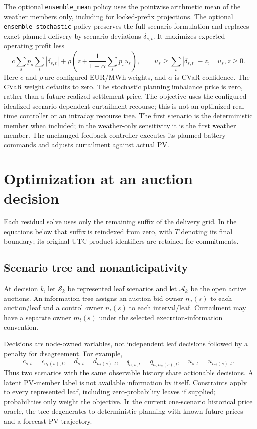 \documentclass[11pt,a4paper]{article}
\begin{document}
The optional \texttt{ensemble\_mean} policy uses the pointwise arithmetic mean
of the weather members only, including for locked-prefix projections. The
optional \texttt{ensemble\_stochastic} policy preserves the full scenario
formulation and replaces exact planned delivery by scenario deviations $\delta_{s,t}$.
It maximizes expected operating profit less
\begin{equation}
 c\sum_s p_s\sum_t |\delta_{s,t}| +
 \rho\left(z+\frac{1}{1-\alpha}\sum_s p_s u_s\right),
 \qquad u_s\ge\sum_t |\delta_{s,t}|-z,\quad u_s,z\ge0.
\end{equation}
Here $c$ and $\rho$ are configured EUR/MWh weights, and $\alpha$ is CVaR
confidence. The CVaR weight defaults to zero. The stochastic planning
imbalance price is zero, rather than a future realized settlement price. The
objective uses the configured idealized scenario-dependent curtailment recourse;
this is not an optimized real-time controller or an intraday recourse tree.
The first scenario is the deterministic member when included; in the weather-only
sensitivity it is the first weather member. The unchanged feedback controller
executes its planned battery commands and adjusts curtailment against actual PV.

\section{Optimization at an auction decision}

Each residual solve uses only the remaining suffix of the delivery grid. In the
equations below that suffix is reindexed from zero, with $T$ denoting its final
boundary; its original UTC product identifiers are retained for commitments.

\subsection{Scenario tree and nonanticipativity}
At decision $k$, let $\mathcal S_k$ be represented leaf scenarios and let
$\mathcal A_k$ be the open active auctions. An information tree assigns an auction
bid owner $n_a(s)$ to each auction/leaf and a control owner $n_t(s)$ to each
interval/leaf. Curtailment may have a separate owner $m_t(s)$ under the selected
execution-information convention.

Decisions are node-owned variables, not independent leaf decisions followed by a
penalty for disagreement. For example,
\begin{equation}
 c_{s,t}=c_{n_t(s),t},\quad d_{s,t}=d_{n_t(s),t},\quad
 q_{a,s,t}=q_{a,n_a(s),t},\quad u_{s,t}=u_{m_t(s),t}.
\end{equation}
Thus two scenarios with the same observable history share actionable decisions.
A latent PV-member label is not available information by itself. Constraints
apply to every represented leaf, including zero-probability leaves if supplied;
probabilities only weight the objective. In the current one-scenario historical
price oracle, the tree degenerates to deterministic planning with known future
prices and a forecast PV trajectory.
\end{document}
